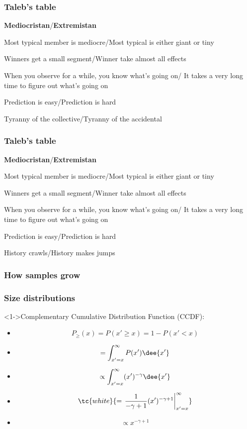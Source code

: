 \begin{frame}
  \frametitle{Taleb's table}

{\small
  \textbf{Mediocristan}/\textbf{Extremistan}
  
  Most typical member is mediocre/Most typical is either giant or tiny

  Winners get a small segment/Winner take almost all effects 

  When you observe for a while, you know what's going on/
  It takes a very long time to figure out what's going on
  
  Prediction is easy/Prediction is hard

  
  \inv

  Tyranny of the collective/Tyranny of the accidental
}



\end{frame}

\begin{frame}
  \frametitle{Taleb's table}

{\small
  \textbf{Mediocristan}/\textbf{Extremistan}
  
  Most typical member is mediocre/Most typical is either giant or tiny

  Winners get a small segment/Winner take almost all effects 

  When you observe for a while, you know what's going on/
  It takes a very long time to figure out what's going on
  
  Prediction is easy/Prediction is hard

  History crawls/History makes jumps

}



\end{frame}

\begin{frame}
  \frametitle{How samples grow}

\end{frame}


\begin{frame}
  \frametitle{Size distributions}

  \begin{block}<1->{Complementary Cumulative Distribution Function (CCDF):}
    \begin{itemize}
    \item<2->
      $$ P_{\ge}(x) = P(x' \ge x)  = 1 - P(x'<x) $$
    \item<3->
      $$ = \int_{x' = x}^{\infty} P(x') \dee{x'}  $$
    \item<4->
      $$ \propto \int_{x' = x}^{\infty} (x')^{-\gamma} \dee{x'}  $$
    \item<5->
      $$\tc{white}{ = \left. \frac{1}{-\gamma+1}(x')^{-\gamma+1} \right|_{x' = x}^{\infty}} $$
    \item<6->
      $$ \propto x^{-\gamma+1} $$
    \end{itemize}
  \end{block}

\end{frame}

